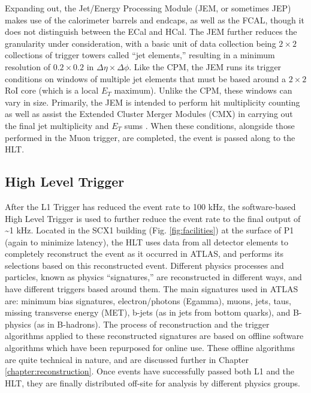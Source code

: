         Expanding out, the Jet/Energy Processing Module (JEM, or sometimes JEP) makes use of the calorimeter barrels and endcaps, as well as the FCAL, though it does not distinguish between the ECal and HCal.
        The JEM further reduces the granularity under consideration, with a basic unit of data collection being $2 \times 2$ collections of trigger towers called ``jet elements,'' resulting in a minimum resolution of $0.2 \times 0.2$ in $\Delta \eta \times \Delta \phi$.
        Like the CPM, the JEM runs its trigger conditions on windows of multiple jet elements that must be based around a $2 \times 2$ RoI core (which is a local $E_T$ maximum).
        Unlike the CPM, these windows can vary in size.
        Primarily, the JEM is intended to perform hit multiplicity counting
            as well as assist the Extended Cluster Merger Modules (CMX) in carrying out the final jet multiplicity
            and $E_T$ sums \cite{L1_calo_run1}\cite{trigger_run2}.
        When these conditions, alongside those performed in the Muon trigger, are completed, the event is passed along to the HLT.


\FloatBarrier
    \subsection{High Level Trigger}

        After the L1 Trigger has reduced the event rate to 100 kHz, the software-based High Level Trigger is used to further reduce the event rate to the final output of \textasciitilde 1 kHz.
        Located in the SCX1 building (Fig. \ref{fig:facilities}) at the surface of P1 (again to minimize latency), the HLT uses data from all detector elements to completely reconstruct the event as it occurred in ATLAS, and performs its selections based on this reconstructed event.
        Different physics processes and particles, known as physics ``signatures,'' are reconstructed in different ways, and have different triggers based around them. 
        The main signatures used in ATLAS are: minimum bias signatures, electron/photons (Egamma), muons, jets, taus, missing transverse energy (MET), b-jets (as in jets from bottom quarks), and B-physics (as in B-hadrons).
        The process of reconstruction and the trigger algorithms applied to these reconstructed signatures are based on offline software algorithms which have been repurposed for online use.
        These offline algorithms are quite technical in nature, and are discussed further in Chapter \ref{chapter:reconstruction}.
        Once events have successfully passed both L1 and the HLT, they are finally distributed off-site for analysis by different physics groups.

